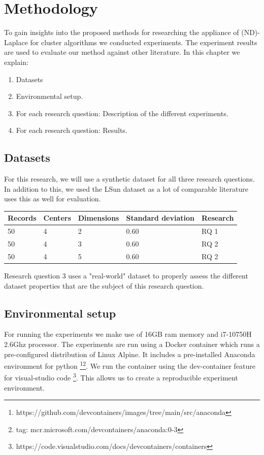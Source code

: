 \chapter{Methodology}

To gain insights into the proposed methods for researching the appliance of (ND)-Laplace for cluster algorithms we conducted experiments.
The experiment results are used to evaluate our method against other literature.
In this chapter we explain:
\begin{enumerate}

  \item Datasets
  \item Environmental setup.
  \item For each research question: Description of the different experiments.
  \item For each research question: Results.
\end{enumerate}

\section{Datasets}
For this research, we will use a synthetic dataset for all three research questions.
In addition to this, we used the LSun dataset as a lot of comparable literature uses this as well for evaluation.
\begin{table}[h]
  \begin{tabular}{@{}lllll@{}}
    \toprule
    Records & Centers & Dimensions & Standard deviation & Research \\ \midrule
    50      & 4       & 2          & 0.60               & RQ 1     \\ \bottomrule
    50      & 4       & 3          & 0.60               & RQ 2     \\ \bottomrule
    50      & 4       & 5          & 0.60               & RQ 2     \\ \bottomrule
  \end{tabular}
\end{table}

Research question 3 uses a "real-world" dataset to properly assess the different dataset properties that are the subject of this research question.
\section{Environmental setup}
For running the experiments we make use of 16GB ram memory and i7-10750H 2.6Ghz processor.
The experiments are run using a Docker container which runs a pre-configured distribution of Linux Alpine.
It includes a pre-installed Anaconda environment for python \footnote{https://github.com/devcontainers/images/tree/main/src/anaconda}\footnote{tag: mcr.microsoft.com/devcontainers/anaconda:0-3}.
We run the container using the dev-container feature for visual-studio code \footnote{https://code.visualstudio.com/docs/devcontainers/containers}.
This allows us to create a reproducible experiment environment.
\newpage

